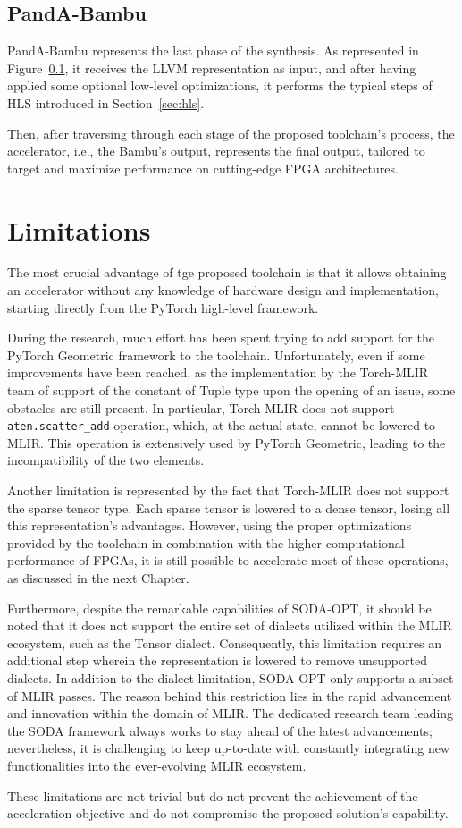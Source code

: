 \subsection{PandA-Bambu}
\label{subsec:toolchain-panda_bambu}%

PandA-Bambu represents the last phase of the synthesis.
As represented in Figure~\ref{subsec:toolchain-panda_bambu}, it receives the LLVM representation as input, and after having applied some optional low-level optimizations, it performs the typical steps of HLS introduced in Section~\ref{sec:hls}.

Then, after traversing through each stage of the proposed toolchain's process, the accelerator, i.e., the Bambu's output, represents the final output, tailored to target and maximize performance on cutting-edge FPGA architectures.

\section{Limitations}
\label{sec:toolchain-limitations}%

The most crucial advantage of tge proposed toolchain is that it allows obtaining an accelerator without any knowledge of hardware design and implementation, starting directly from the PyTorch high-level framework.

During the research, much effort has been spent trying to add support for the PyTorch Geometric framework to the toolchain.
Unfortunately, even if some improvements have been reached, as the implementation by the Torch-MLIR team of support of the constant of Tuple type upon the opening of an issue, some obstacles are still present.
In particular, Torch-MLIR does not support \texttt{aten.scatter\_add} operation, which, at the actual state, cannot be lowered to MLIR.
This operation is extensively used by PyTorch Geometric, leading to the incompatibility of the two elements.

Another limitation is represented by the fact that Torch-MLIR does not support the sparse tensor type.
Each sparse tensor is lowered to a dense tensor, losing all this representation's advantages.
However, using the proper optimizations provided by the toolchain in combination with the higher computational performance of FPGAs, it is still possible to accelerate most of these operations, as discussed in the next Chapter.

Furthermore, despite the remarkable capabilities of SODA-OPT, it should be noted that it does not support the entire set of dialects utilized within the MLIR ecosystem, such as the Tensor dialect.
Consequently, this limitation requires an additional step wherein the representation is lowered to remove unsupported dialects.
In addition to the dialect limitation, SODA-OPT only supports a subset of MLIR passes.
The reason behind this restriction lies in the rapid advancement and innovation within the domain of MLIR.
The dedicated research team leading the SODA framework always works to stay ahead of the latest advancements; nevertheless, it is challenging to keep up-to-date with constantly integrating new functionalities into the ever-evolving MLIR ecosystem.

These limitations are not trivial but do not prevent the achievement of the acceleration objective and do not compromise the proposed solution's capability.